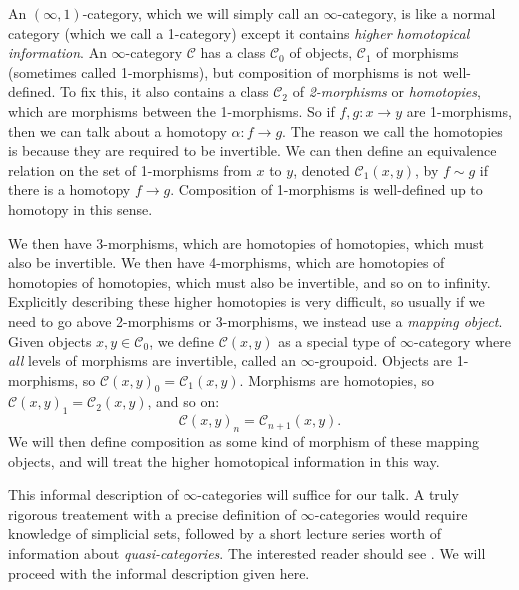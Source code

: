 An $(\infty ,1)$-category, which we will simply call an $\infty $-category, is like a normal category (which we call a 1-category) except it contains \emph{higher homotopical information}. An $\infty $-category $\mathcal{C} $ has a class $\mathcal{C} _0$ of objects, $\mathcal{C} _1$ of morphisms (sometimes called 1-morphisms), but composition of morphisms is not well-defined. To fix this, it also contains a class $\mathcal{C} _2$ of \emph{2-morphisms} or \emph{homotopies}, which are morphisms between the 1-morphisms. So if $f,g : x \to y$ are 1-morphisms, then we can talk about a homotopy $\alpha : f \to g$. The reason we call the homotopies is because they are required to be invertible. We can then define an equivalence relation on the set of 1-morphisms from $x$ to $y$, denoted $\mathcal{C} _1(x,y)$, by $f\sim g$ if there is a homotopy $f \to g$. Composition of 1-morphisms is well-defined up to homotopy in this sense.

We then have 3-morphisms, which are homotopies of homotopies, which must also be invertible. We then have 4-morphisms, which are homotopies of homotopies of homotopies, which must also be invertible, and so on to infinity. Explicitly describing these higher homotopies is very difficult, so usually if we need to go above 2-morphisms or 3-morphisms, we instead use a \emph{mapping object}. Given objects $x,y\in \mathcal{C} _0$, we define $\mathcal{C} (x,y)$ as a special type of $\infty $-category where \emph{all} levels of morphisms are invertible, called an $\infty $-groupoid. Objects are 1-morphisms, so $\mathcal{C} (x,y)_0=\mathcal{C} _1(x,y)$. Morphisms are homotopies, so $\mathcal{C} (x,y)_1=\mathcal{C} _2(x,y)$, and so on:
\[
	\mathcal{C} (x,y)_n=\mathcal{C} _{n+1} (x,y)
.\]
We will then define composition as some kind of morphism of these mapping objects, and will treat the higher homotopical information in this way.

This informal description of $\infty $-categories will suffice for our talk. A truly rigorous treatement with a precise definition of $\infty $-categories would require knowledge of simplicial sets, followed by a short lecture series worth of information about \emph{quasi-categories}. The interested reader should see \cite{HTT}. We will proceed with the informal description given here.
